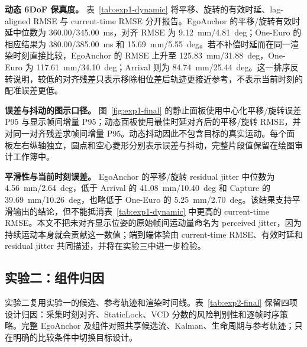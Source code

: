 \documentclass[review]{vgtc}
\begin{document}
\textbf{动态 6DoF 保真度。} 表~\ref{tab:exp1-dynamic} 将平移、旋转的有效时延、lag-aligned RMSE 与 current-time RMSE 分开报告。EgoAnchor 的平移/旋转有效时延中位数为 360.00/345.00~ms，对齐 RMSE 为 9.12~mm/4.81~deg；One-Euro 的相应结果为 380.00/385.00~ms 和 15.69~mm/5.55~deg。若不补偿时延而在同一渲染时刻直接比较，EgoAnchor 的 RMSE 上升至 125.83~mm/31.88~deg，One-Euro 为 117.61~mm/34.10~deg；Arrival 则为 84.74~mm/25.44~deg。这一排序反转说明，较低的对齐残差只表示移除相位差后轨迹更接近参考，不表示当前时刻的配准误差更低。

\textbf{误差与抖动的图示口径。} 图~\ref{fig:exp1-final} 的静止面板使用中心化平移/旋转误差 P95 与显示帧间增量 P95；动态面板使用最佳时延对齐后的平移/旋转 RMSE，并对同一对齐残差求帧间增量 P95。动态抖动因此不包含目标的真实运动。每个面板左右纵轴独立，圆点和空心菱形分别表示误差与抖动，完整片段值保留在绘图审计工作簿中。

\textbf{平滑性与当前时刻误差。} EgoAnchor 的平移/旋转 residual jitter 中位数为 4.56~mm/2.64~deg，低于 Arrival 的 41.08~mm/10.40~deg 和 Capture 的 39.69~mm/10.26~deg，也略低于 One-Euro 的 5.25~mm/2.70~deg。该结果支持平滑输出的结论，但不能抵消表~\ref{tab:exp1-dynamic} 中更高的 current-time RMSE。本文不把未对齐显示位姿的原始帧间运动量命名为 perceived jitter，因为持续运动本身就会贡献这一数值；端到端体验由 current-time RMSE、有效时延和 residual jitter 共同描述，并将在实验三中进一步检验。


\subsection{实验二：组件归因}

实验二复用实验一的候选、参考轨迹和渲染时间线。表~\ref{tab:exp2-final} 保留四项设计归因：采集时刻对齐、StaticLock、VCD 分数的风险判别性和逐帧时序策略。完整 EgoAnchor 及组件对照共享候选流、Kalman、生命周期与参考轨迹；只在明确的比较条件中切换目标设计。
\end{document}

